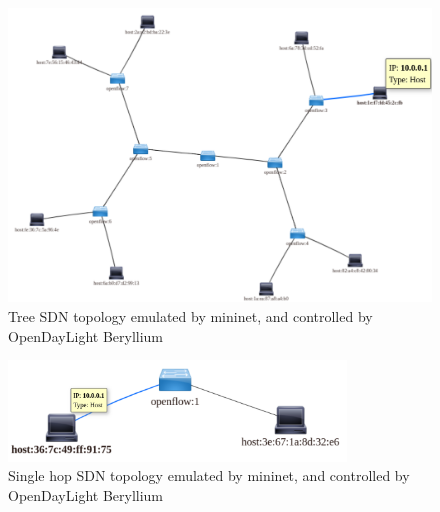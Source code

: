 \begin{figure}[!thb]
    \centering
    \includegraphics[width=\textwidth]{figures/ch5/topo-tree}
    \caption{Tree SDN topology emulated by mininet, and controlled by OpenDayLight Beryllium}
    \label{fig:topo-tree}
\end{figure}

\begin{figure}[!ht]
    \centering
    \includegraphics[width=0.8\textwidth]{figures/ch5/topo-simple}
    \caption{Single hop SDN topology emulated by mininet, and controlled by OpenDayLight Beryllium}
    \label{fig:topo-simple}
\end{figure}


